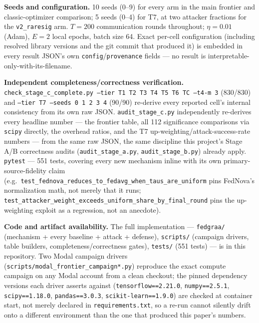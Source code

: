 \documentclass{llncs}
\begin{document}
\textbf{Seeds and configuration.} 10 seeds (0--9) for every arm in the main frontier and classic-optimizer comparison; 5 seeds (0--4) for T7, at two attacker fractions for the \texttt{v2\_raresig} arm. $T=200$ communication rounds throughout; $\eta=0.01$ (Adam), $E=2$ local epochs, batch size 64. Exact per-cell configuration (including resolved library versions and the git commit that produced it) is embedded in every result JSON's own \texttt{config}/\texttt{provenance} fields --- no result is interpretable-only-with-its-filename.

\textbf{Independent completeness/correctness verification.} \texttt{check\_stage\_c\_complete.py --tier T1 T2 T3 T4 T5 T6 TC --t4-m 3} (830/830) and \texttt{--tier T7 --seeds 0 1 2 3 4} (90/90) re-derive every reported cell's internal consistency from its own raw JSON. \texttt{audit\_stage\_c.py} independently re-derives every headline number --- the frontier table, all 112 significance comparisons via \texttt{scipy} directly, the overhead ratios, and the T7 up-weighting/attack-success-rate numbers --- from the same raw JSON, the same discipline this project's Stage A/B correctness audits (\texttt{audit\_stage\_a.py}, \texttt{audit\_stage\_b.py}) already apply. \texttt{pytest} --- 551 tests, covering every new mechanism inline with its own primary-source-fidelity claim (e.g.\ \texttt{test\_fednova\_reduces\_to\_fedavg\_when\_taus\_are\_uniform} pins FedNova's normalization math, not merely that it runs; \texttt{test\_attacker\_weight\_exceeds\_uniform\_share\_by\_final\_round} pins the up-weighting exploit as a regression, not an anecdote).

\textbf{Code and artifact availability.} The full implementation --- \texttt{fedgraa/} (mechanism + every baseline + attack + defense), \texttt{scripts/} (campaign drivers, table builders, completeness/correctness gates), \texttt{tests/} (551 tests) --- is in this repository. Two Modal campaign drivers (\texttt{scripts/modal\_frontier\_campaign*.py}) reproduce the exact compute campaign on any Modal account from a clean checkout; the pinned dependency versions each driver asserts against (\texttt{tensorflow==2.21.0}, \texttt{numpy==2.5.1}, \texttt{scipy==1.18.0}, \texttt{pandas==3.0.3}, \texttt{scikit-learn==1.9.0}) are checked at container start, not merely declared in \texttt{requirements.txt}, so a re-run cannot silently drift onto a different environment than the one that produced this paper's numbers.
\end{document}
